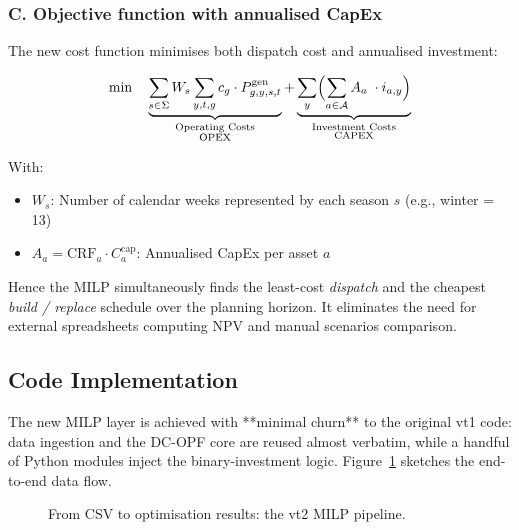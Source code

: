 \subsubsection*{C.  Objective function with annualised CapEx}
\label{ssec:MILP_objective}

\begin{adjustwidth}{1.5em}{0pt}  %
The new cost function minimises both dispatch cost and annualised investment:

\begin{equation}
    \min \quad
    \underbrace{\sum_{s \in \Sigma} W_s \sum_{y,t,g} c_g \cdot P^{\text{gen}}_{g,y,s,t}}_{\substack{\text{Operating Costs} \\ \text{OPEX}}}
    +
    \underbrace{\sum_{y}\Bigl(
    \sum_{a\in\mathcal{A}}
        A_a \;\cdot i_{a,y}\Bigr)}_{\substack{\text{Investment Costs} \\ \text{CAPEX}}}
\end{equation}

With:
\begin{itemize}
    \item $W_s$: Number of calendar weeks represented by each season $s$ (e.g., winter = 13)
    \item $A_a = \mathrm{CRF}_a \cdot C^{\text{cap}}_a$: Annualised CapEx per asset $a$
\end{itemize}

Hence the MILP simultaneously finds the least-cost \emph{dispatch} and the cheapest \emph{build / replace} schedule over the planning horizon. It eliminates the need for external spreadsheets computing NPV and manual scenarios comparison.
\end{adjustwidth}

\subsection{Code Implementation}
\label{ssec:MILP_code}

The new MILP layer is achieved with **minimal churn** to the original vt1 code:  
data ingestion and the DC-OPF core are reused almost verbatim, while a handful of
Python modules inject the binary-investment logic.  
Figure~\ref{fig:milp_pipeline} sketches the end-to-end data flow.

\begin{figure}[H]
\centering
\caption{From CSV to optimisation results: the vt2 MILP pipeline.}
\label{fig:milp_pipeline}
\end{figure}


